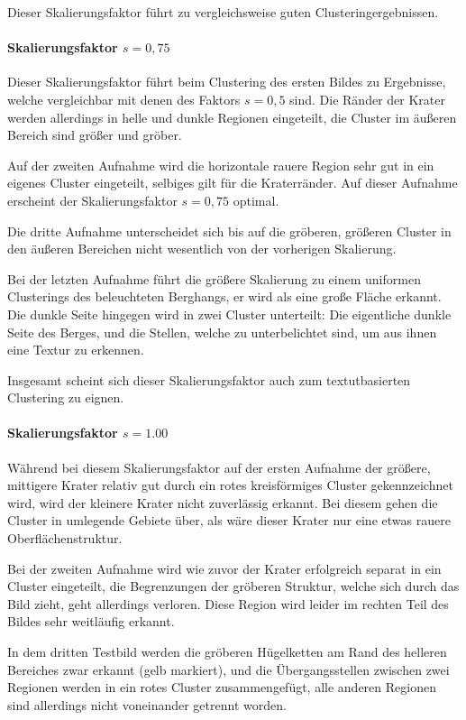 Dieser Skalierungsfaktor führt zu vergleichsweise guten Clusteringergebnissen.

\paragraph{Skalierungsfaktor $s=0,75$}

Dieser Skalierungsfaktor führt beim Clustering des ersten Bildes zu Ergebnisse, welche vergleichbar mit denen des Faktors $s=0,5$ sind. Die Ränder der Krater werden allerdings in helle und dunkle Regionen eingeteilt, die Cluster im äußeren Bereich sind größer und gröber.

Auf der zweiten Aufnahme wird die horizontale rauere Region sehr gut in ein eigenes Cluster eingeteilt, selbiges gilt für die Kraterränder. Auf dieser Aufnahme erscheint der Skalierungsfaktor $s=0,75$ optimal.

Die dritte Aufnahme unterscheidet sich bis auf die gröberen, größeren Cluster in den äußeren Bereichen nicht wesentlich von der vorherigen Skalierung.

Bei der letzten Aufnahme führt die größere Skalierung zu einem uniformen Clusterings des beleuchteten Berghangs, er wird als eine große Fläche erkannt. Die dunkle Seite hingegen wird in zwei Cluster unterteilt: Die eigentliche dunkle Seite des Berges, und die Stellen, welche zu unterbelichtet sind, um aus ihnen eine Textur zu erkennen.

Insgesamt scheint sich dieser Skalierungsfaktor auch zum textutbasierten Clustering zu eignen.

\paragraph{Skalierungsfaktor $s=1.00$}

Während bei diesem Skalierungsfaktor auf der ersten Aufnahme der größere, mittigere Krater relativ gut durch ein rotes kreisförmiges Cluster gekennzeichnet wird, wird der kleinere Krater nicht zuverlässig erkannt. Bei diesem gehen die Cluster in umlegende Gebiete über, als wäre dieser Krater nur eine etwas rauere Oberflächenstruktur.

Bei der zweiten Aufnahme wird wie zuvor der Krater erfolgreich separat in ein Cluster eingeteilt, die Begrenzungen der gröberen Struktur, welche sich durch das Bild zieht, geht allerdings verloren. Diese Region wird leider im rechten Teil des Bildes sehr weitläufig erkannt.

In dem dritten Testbild werden die gröberen Hügelketten am Rand des helleren Bereiches zwar erkannt (gelb markiert), und die Übergangsstellen zwischen zwei Regionen werden in ein rotes Cluster zusammengefügt,  alle anderen Regionen sind allerdings nicht voneinander getrennt worden.

